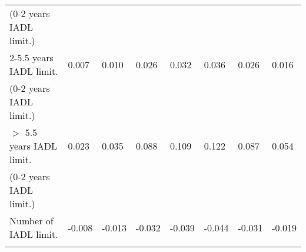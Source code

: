\documentclass[12pt]{article}
\begin{document}
\begin{table}[htbp]
\begin{tabular}{l lllllll}
(0-2 years IADL limit.)                 &&&&&&& \\
\rule{0pt}{3ex}2-5.5 years IADL limit.  &  0.007 &  0.010 &  0.026 &  0.032 &  0.036 &  0.026 &  0.016 \\
(0-2 years IADL limit.)                 &&&&&&& \\
\rule{0pt}{3ex}$>$ 5.5 years IADL limit.&  0.023 &  0.035 &  0.088 &  0.109 &  0.122 &  0.087 &  0.054 \\
(0-2 years IADL limit.)                 &&&&&&& \\
\rule{0pt}{3ex}Number of IADL limit.    & -0.008 & -0.013 & -0.032 & -0.039 & -0.044 & -0.031 & -0.019 \\
                                        &&&&&&& \\
\hline
\end{tabular}
\end{table}
\end{document}
